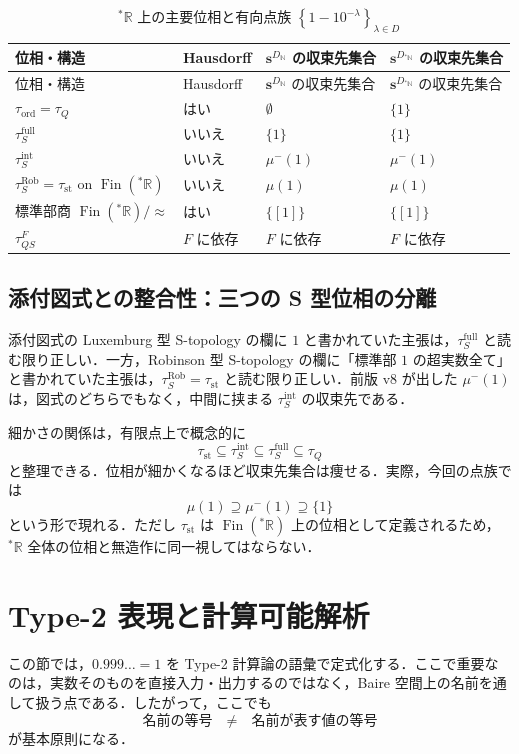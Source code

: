 \documentclass[a4paper,11pt]{ltjsarticle}
\theoremstyle{jpdef}
\theoremstyle{jpthm}
\newcommand{\N}{\mathbb{N}}
\newcommand{\R}{\mathbb{R}}
\newcommand{\Fin}{\operatorname{Fin}}
\newcommand{\DN}{D_{\N}}
\newcommand{\DStarN}{D_{{}^{\ast}\N}}
\newcommand{\seq}[2]{\left\{#1\right\}_{#2}}
\newcommand{\ulim}[1]{{}^{\ast}#1}
\newcommand{\taufullS}{\tau^{\mathrm{full}}_{S}}
\newcommand{\tauintS}{\tau^{\mathrm{int}}_{S}}
\newcommand{\taust}{\tau_{\mathrm{st}}}
\newcommand{\tauRobS}{\tau^{\mathrm{Rob}}_{S}}
\newcommand{\tauQ}{\tau_{Q}}
\newcommand{\tauord}{\tau_{\mathrm{ord}}}
\begin{document}
\begin{longtable}{L{34mm}C{18mm}C{40mm}C{40mm}}
\caption{\(\ulim\R\) 上の主要位相と有向点族 \(\seq{1-10^{-\lambda}}{\lambda\in D}\)}\label{tab:star-topologies}\\
\toprule
位相・構造 & Hausdorff & \(\mathbf s^{\DN}\) の収束先集合 & \(\mathbf s^{\DStarN}\) の収束先集合\\
\midrule
\endfirsthead
\toprule
位相・構造 & Hausdorff & \(\mathbf s^{\DN}\) の収束先集合 & \(\mathbf s^{\DStarN}\) の収束先集合\\
\midrule
\endhead
\(\tauord=\tauQ\) & はい & \(\emptyset\) & \(\{1\}\)\\
\(\taufullS\) & いいえ & \(\{1\}\) & \(\{1\}\)\\
\(\tauintS\) & いいえ & \(\mu^-(1)\) & \(\mu^-(1)\)\\
\(\tauRobS=\taust\) on \(\Fin(\ulim\R)\) & いいえ & \(\mu(1)\) & \(\mu(1)\)\\
標準部商 \(\Fin(\ulim\R)/\approx\) & はい & \(\{[1]\}\) & \(\{[1]\}\)\\
\(\tau^F_{QS}\) & \(F\) に依存 & \(F\) に依存 & \(F\) に依存\\
\bottomrule
\end{longtable}

\subsection{添付図式との整合性：三つの S 型位相の分離}

添付図式の Luxemburg 型 S-topology の欄に \(1\) と書かれていた主張は，\(\taufullS\) と読む限り正しい．一方，Robinson 型 S-topology の欄に「標準部 \(1\) の超実数全て」と書かれていた主張は，\(\tauRobS=\taust\) と読む限り正しい．前版 v8 が出した \(\mu^-(1)\) は，図式のどちらでもなく，中間に挟まる \(\tauintS\) の収束先である．

細かさの関係は，有限点上で概念的に
\[
  \taust\subseteq\tauintS\subseteq\taufullS\subseteq\tauQ
\]
と整理できる．位相が細かくなるほど収束先集合は痩せる．実際，今回の点族では
\[
  \mu(1)\supseteq\mu^-(1)\supseteq\{1\}
\]
という形で現れる．ただし \(\taust\) は \(\Fin(\ulim\R)\) 上の位相として定義されるため，\(\ulim\R\) 全体の位相と無造作に同一視してはならない．
\section{Type-2 表現と計算可能解析}

この節では，\(0.999\ldots=1\) を Type-2 計算論の語彙で定式化する．ここで重要なのは，実数そのものを直接入力・出力するのではなく，Baire 空間上の名前を通して扱う点である．したがって，ここでも
\[
  \text{名前の等号} \quad\ne\quad \text{名前が表す値の等号}
\]
が基本原則になる．
\end{document}
